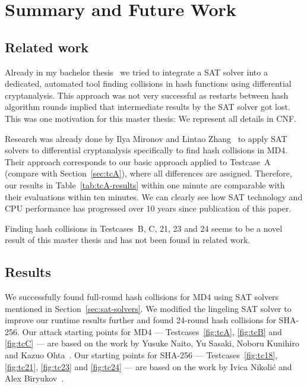 \renewcommand*\chappic{}
\renewcommand*\chapquote{}
\chapter{Summary and Future Work}
\label{ch:summary}
%
\section{Related work}
\label{sec:results-related}
%
Already in my bachelor thesis~\cite{bach} we tried to integrate a SAT solver into
a dedicated, automated tool finding collisions in hash functions using differential
cryptanalysis. This approach was not very successful as restarts between hash
algorithm rounds implied that intermediate results by the SAT solver got lost.
This was one motivation for this master thesis: We represent all details in CNF.

Research was already done by Ilya Mironov and Lintao Zhang~\cite{mironov2006applications}
to apply SAT solvers to differential cryptanalysis specifically to find hash collisions
in MD4. Their approach corresponds to our basic approach applied to Testcase~A
(compare with Section~\ref{sec:tcA}), where all differences are assigned.
Therefore, our results in Table~\ref{tab:tcA-results} within one minute are
comparable with their evaluations within ten minutes.
We can clearly see how SAT technology and CPU performance
has progressed over 10 years since publication of this paper.

Finding hash collisions in Testcases~B, C, 21, 23 and 24 seems
to be a novel result of this master thesis and has not been found
in related work.

\section{Results}
\label{sec:conclusion}
%
We successfully found full-round hash collisions for MD4
using SAT solvers mentioned in Section~\ref{sec:sat-solvers}.
We modified the lingeling SAT solver to improve our
runtime results further and found 24-round hash collisions
for SHA-256. Our attack starting points for MD4 ---
Testcases~\ref{fig:tcA}, \ref{fig:tcB} and \ref{fig:tcC} ---
are based on the work by Yusuke Naito, Yu Sasaki, Noboru Kunihiro and
Kazuo Ohta~\cite{sasaki2007new}. Our starting points for SHA-256
--- Testcases~\ref{fig:tc18}, \ref{fig:tc21}, \ref{fig:tc23}
and \ref{fig:tc24} --- are based on the work by Ivica Nikoli{\'c}
and Alex Biryukov~\cite{nikolic2008collisions}.

